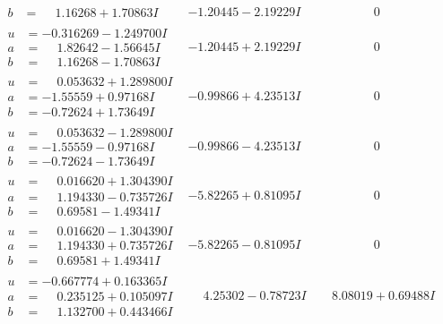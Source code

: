 \documentclass[1p]{elsarticle_modified}
\theoremstyle{definition}
\begin{document}
$$\begin{array}{c|c|c}
\begin{aligned}
b &= \phantom{-}1.16268 + 1.70863 I\end{aligned}
 & -1.20445 - 2.19229 I & \phantom{-0.000000 } 0 \\ \hline\begin{aligned}
u &= -0.316269 - 1.249700 I \\
a &= \phantom{-}1.82642 - 1.56645 I \\
b &= \phantom{-}1.16268 - 1.70863 I\end{aligned}
 & -1.20445 + 2.19229 I & \phantom{-0.000000 } 0 \\ \hline\begin{aligned}
u &= \phantom{-}0.053632 + 1.289800 I \\
a &= -1.55559 + 0.97168 I \\
b &= -0.72624 + 1.73649 I\end{aligned}
 & -0.99866 + 4.23513 I & \phantom{-0.000000 } 0 \\ \hline\begin{aligned}
u &= \phantom{-}0.053632 - 1.289800 I \\
a &= -1.55559 - 0.97168 I \\
b &= -0.72624 - 1.73649 I\end{aligned}
 & -0.99866 - 4.23513 I & \phantom{-0.000000 } 0 \\ \hline\begin{aligned}
u &= \phantom{-}0.016620 + 1.304390 I \\
a &= \phantom{-}1.194330 - 0.735726 I \\
b &= \phantom{-}0.69581 - 1.49341 I\end{aligned}
 & -5.82265 + 0.81095 I & \phantom{-0.000000 } 0 \\ \hline\begin{aligned}
u &= \phantom{-}0.016620 - 1.304390 I \\
a &= \phantom{-}1.194330 + 0.735726 I \\
b &= \phantom{-}0.69581 + 1.49341 I\end{aligned}
 & -5.82265 - 0.81095 I & \phantom{-0.000000 } 0 \\ \hline\begin{aligned}
u &= -0.667774 + 0.163365 I \\
a &= \phantom{-}0.235125 + 0.105097 I \\
b &= \phantom{-}1.132700 + 0.443466 I\end{aligned}
 & \phantom{-}4.25302 - 0.78723 I & \phantom{-}8.08019 + 0.69488 I \\ \hline\begin{aligned}

\end{aligned}
\end{array}$$
\end{document}
